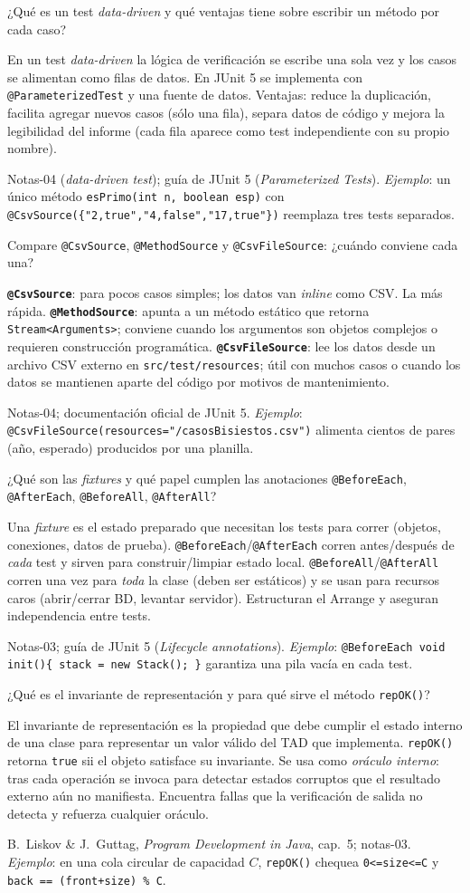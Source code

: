 \documentclass[11pt,a4paper]{article}
\newcounter{preg}
\newcommand{\qa}[3]{%
  \stepcounter{preg}%
  \vspace{0.4em}
  \begin{preguntabox}{\thepreg}
  #1
  \end{preguntabox}
  \begin{respuestabox}
  #2
  \end{respuestabox}
  \begin{refbox}
  #3
  \end{refbox}
  \vspace{0.6em}
}
\begin{document}
\qa{¿Qué es un test \emph{data-driven} y qué ventajas tiene sobre escribir un método por cada caso?}
{En un test \emph{data-driven} la lógica de verificación se escribe una sola vez y los casos se alimentan como filas de datos. En JUnit 5 se implementa con \texttt{@ParameterizedTest} y una fuente de datos. Ventajas: reduce la duplicación, facilita agregar nuevos casos (sólo una fila), separa datos de código y mejora la legibilidad del informe (cada fila aparece como test independiente con su propio nombre).}
{Notas-04 (\emph{data-driven test}); guía de JUnit 5 (\emph{Parameterized Tests}). \emph{Ejemplo}: un único método \texttt{esPrimo(int n, boolean esp)} con \texttt{@CsvSource(\{"2,true","4,false","17,true"\})} reemplaza tres tests separados.}

\qa{Compare \texttt{@CsvSource}, \texttt{@MethodSource} y \texttt{@CsvFileSource}: ¿cuándo conviene cada una?}
{\textbf{\texttt{@CsvSource}}: para pocos casos simples; los datos van \emph{inline} como CSV. La más rápida. \textbf{\texttt{@MethodSource}}: apunta a un método estático que retorna \texttt{Stream<Arguments>}; conviene cuando los argumentos son objetos complejos o requieren construcción programática. \textbf{\texttt{@CsvFileSource}}: lee los datos desde un archivo CSV externo en \texttt{src/test/resources}; útil con muchos casos o cuando los datos se mantienen aparte del código por motivos de mantenimiento.}
{Notas-04; documentación oficial de JUnit 5. \emph{Ejemplo}: \texttt{@CsvFileSource(resources="/casosBisiestos.csv")} alimenta cientos de pares (año, esperado) producidos por una planilla.}

\qa{¿Qué son las \emph{fixtures} y qué papel cumplen las anotaciones \texttt{@BeforeEach}, \texttt{@AfterEach}, \texttt{@BeforeAll}, \texttt{@AfterAll}?}
{Una \emph{fixture} es el estado preparado que necesitan los tests para correr (objetos, conexiones, datos de prueba). \texttt{@BeforeEach}/\texttt{@AfterEach} corren antes/después de \emph{cada} test y sirven para construir/limpiar estado local. \texttt{@BeforeAll}/\texttt{@AfterAll} corren una vez para \emph{toda} la clase (deben ser estáticos) y se usan para recursos caros (abrir/cerrar BD, levantar servidor). Estructuran el Arrange y aseguran independencia entre tests.}
{Notas-03; guía de JUnit 5 (\emph{Lifecycle annotations}). \emph{Ejemplo}: \texttt{@BeforeEach void init()\{ stack = new Stack(); \}} garantiza una pila vacía en cada test.}

\qa{¿Qué es el invariante de representación y para qué sirve el método \texttt{repOK()}?}
{El invariante de representación es la propiedad que debe cumplir el estado interno de una clase para representar un valor válido del TAD que implementa. \texttt{repOK()} retorna \texttt{true} sii el objeto satisface su invariante. Se usa como \emph{oráculo interno}: tras cada operación se invoca para detectar estados corruptos que el resultado externo aún no manifiesta. Encuentra fallas que la verificación de salida no detecta y refuerza cualquier oráculo.}
{B.~Liskov \& J.~Guttag, \emph{Program Development in Java}, cap.~5; notas-03. \emph{Ejemplo}: en una cola circular de capacidad $C$, \texttt{repOK()} chequea \texttt{0<=size<=C} y \texttt{back == (front+size) \% C}.}
\end{document}
